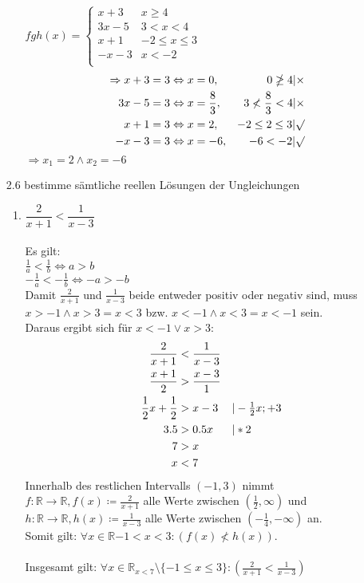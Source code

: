 \documentclass[12pt,letterpaper]{article}
\newcommand{\alignleft}[1]{\tag*{\llap{\makebox[\linewidth][l]{$#1$}}}}
\newcommand{\LLeftrightarrow}{ \alignleft{\Leftrightarrow}}
\newcommand{\eqinfo}[1]{&\makebox[2cm][l]{$\vert #1$}}
\newcommand{\Eqn}[3]{#1 &#2 #3}
\newcommand{\geqnf}[3]{\Eqn{#1}{#2}{#3}\\}
\newcommand{\geqn}[3]{\LLeftrightarrow\Eqn{#1}{#2}{#3}\\}
\newcommand{\geqni}[4]{\LLeftrightarrow\Eqn{#1}{#2}{#3}\eqinfo{#4}\\}
\begin{document}
\begin{enumerate}
\begin{enumerate}
$fgh(x) = \begin{cases}
x+3 &x\geq 4\\
3x-5 &3<x<4\\
x+1 &-2\leq x\leq 3\\
-x-3 &x<-2\\
\end{cases}$\\
\begin{align*}
\Rightarrow x+3&=3 \Leftrightarrow x=0, &0\ngeq 4|\times\\
3x-5&=3 \Leftrightarrow x=\frac{8}{3}, &3\nless\frac{8}{3}< 4|\times\\
x+1&=3 \Leftrightarrow x=2, &-2\leq 2\leq 3|\surd\\
-x-3&=3 \Leftrightarrow x=-6, &-6<-2|\surd\\
\end{align*}
$\Rightarrow x_1 = 2 \land x_2 = -6$
\end{enumerate}
\item [2.6] bestimme sämtliche reellen Lösungen der Ungleichungen
\begin{enumerate}
\item $\dfrac{2}{x+1}<\dfrac{1}{x-3}$\\\\
Es gilt:\\
$\frac{1}{a}<\frac{1}{b}\Leftrightarrow a>b$\\
$-\frac{1}{a}<-\frac{1}{b}\Leftrightarrow -a>-b$\\
Damit $\frac{2}{x+1}$ und $\frac{1}{x-3}$ beide entweder positiv oder negativ sind, muss $x>-1 \land x>3 = x<3$ bzw. $x<-1 \land x<3 = x<-1$ sein.\\
Daraus ergibt sich für $x<-1 \lor x>3$:
\begin{align*}
\geqnf{\frac{2}{x+1}}{<}{\frac{1}{x-3}}
\geqn{\frac{x+1}{2}}{>}{\frac{x-3}{1}}
\geqni{\frac{1}{2}x+\frac{1}{2}}{>}{x-3}{-\frac{1}{2}x; +3}
\geqni{3.5}{>}{0.5x}{*2}
\geqn{7}{>}{x}
\geqn{x}{<}{7}
\end{align*}
Innerhalb des restlichen Intervalls $(-1,3)$ nimmt $f:\mathbb{R}\to\mathbb{R}, f(x)\coloneqq\frac{2}{x+1}$ alle Werte zwischen $(\frac{1}{2},\infty)$ und $h:\mathbb{R}\to\mathbb{R}, h(x)\coloneqq\frac{1}{x-3}$ alle Werte zwischen $(-\frac{1}{4}, -\infty)$ an.\\
Somit gilt: $\forall x\in\mathbb{R}{-1<x<3}:(f(x)\nless h(x))$.\\\\
Insgesamt gilt: $\forall x\in\mathbb{R}_{x<7}\setminus\{-1\leq x\leq3\}:(\frac{2}{x+1}<\frac{1}{x-3})$


\end{enumerate}
\end{enumerate}
\end{document}
